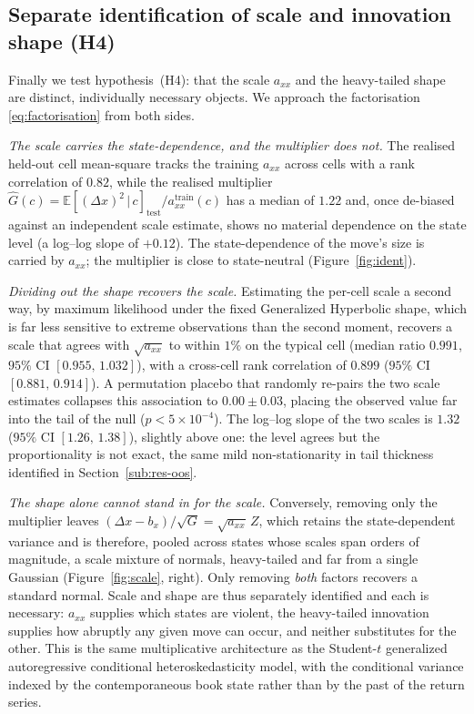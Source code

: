 \documentclass[11pt]{article}
\theoremstyle{plain}
\theoremstyle{definition}
\newcommand{\E}{\mathbb{E}}
\newcommand{\given}{\,\vert\,}
\newcommand{\axx}{a_{xx}}
\begin{document}
\subsection{Separate identification of scale and innovation shape (H4)}
\label{sub:res-ident}

Finally we test hypothesis~(H4): that the scale $\axx$ and the heavy-tailed
shape are distinct, individually necessary objects. We approach the factorisation
\eqref{eq:factorisation} from both sides.

\emph{The scale carries the state-dependence, and the multiplier does not.} The
realised held-out cell mean-square tracks the training $\axx$ across cells with a rank
correlation of $0.82$, while the realised multiplier
$\widehat G(c)=\E[(\Delta x)^2\given c]_{\mathrm{test}}/\axx^{\mathrm{train}}(c)$ has a
median of $1.22$ and, once de-biased against an independent scale estimate, shows no
material dependence on the state level (a log--log slope of $+0.12$). The
state-dependence of the move's size is carried by $\axx$; the multiplier is close to
state-neutral (Figure~\ref{fig:ident}).

\emph{Dividing out the shape recovers the scale.} Estimating the per-cell scale a
second way, by maximum likelihood under the fixed Generalized Hyperbolic shape, which
is far less sensitive to extreme observations than the second moment, recovers a
scale that agrees with $\sqrt{\axx}$ to within $1\%$ on the typical cell (median ratio
$0.991$, $95\%$ CI $[0.955,\,1.032]$), with a cross-cell rank correlation of $0.899$
($95\%$ CI $[0.881,\,0.914]$). A permutation placebo that randomly re-pairs the two
scale estimates collapses this association to $0.00\pm0.03$, placing the observed
value far into the tail of the null
($p<5\times10^{-4}$). The log--log slope of the two scales is $1.32$ ($95\%$ CI
$[1.26,\,1.38]$), slightly above one: the level agrees but the proportionality is not
exact, the same mild non-stationarity in tail thickness identified in
Section~\ref{sub:res-oos}.

\emph{The shape alone cannot stand in for the scale.} Conversely, removing only the
multiplier leaves $(\Delta x-b_x)/\sqrt{G}=\sqrt{\axx}\,Z$, which retains the
state-dependent variance and is therefore, pooled across states whose scales span
orders of magnitude, a scale mixture of normals, heavy-tailed and far from a single
Gaussian (Figure~\ref{fig:scale}, right). Only removing \emph{both} factors recovers a
standard normal. Scale and shape are thus separately identified and each is necessary:
$\axx$ supplies which states are violent, the heavy-tailed innovation supplies how
abruptly any given move can occur, and neither substitutes for the other. This is the
same multiplicative architecture as the Student-$t$ generalized autoregressive
conditional heteroskedasticity model, with the conditional variance indexed by the
contemporaneous book state rather than by the past of the return series.
\end{document}
